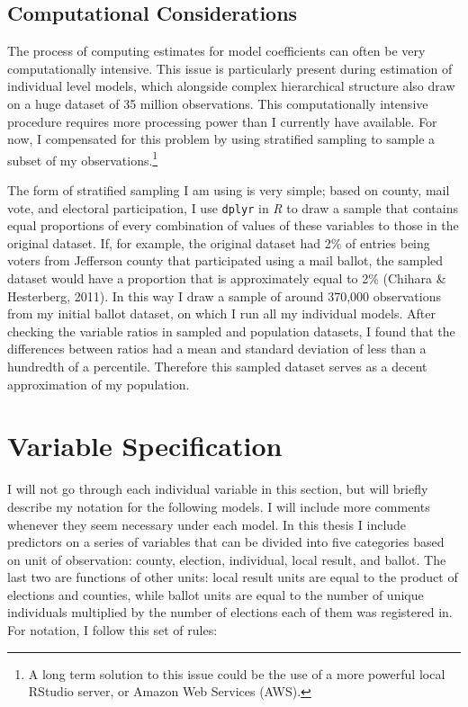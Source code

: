 \documentclass[12pt,twoside]{reedthesis}
\begin{document}
  \subsection{Computational
  Considerations}\label{computational-considerations}
  
  The process of computing estimates for model coefficients can often be
  very computationally intensive. This issue is particularly present
  during estimation of individual level models, which alongside complex
  hierarchical structure also draw on a huge dataset of 35 million
  observations. This computationally intensive procedure requires more
  processing power than I currently have available. For now, I compensated
  for this problem by using stratified sampling to sample a subset of my
  observations.\footnote{A long term solution to this issue could be the
    use of a more powerful local RStudio server, or Amazon Web Services
    (AWS).}
  
  The form of stratified sampling I am using is very simple; based on
  county, mail vote, and electoral participation, I use \texttt{dplyr} in
  \textit{R} to draw a sample that contains equal proportions of every
  combination of values of these variables to those in the original
  dataset. If, for example, the original dataset had 2\% of entries being
  voters from Jefferson county that participated using a mail ballot, the
  sampled dataset would have a proportion that is approximately equal to
  2\% (Chihara \& Hesterberg, 2011). In this way I draw a sample of around
  370,000 observations from my initial ballot dataset, on which I run all
  my individual models. After checking the variable ratios in sampled and
  population datasets, I found that the differences between ratios had a
  mean and standard deviation of less than a hundredth of a percentile.
  Therefore this sampled dataset serves as a decent approximation of my
  population.
  
  \section{Variable Specification}\label{variable-specification}
  
  I will not go through each individual variable in this section, but will
  briefly describe my notation for the following models. I will include
  more comments whenever they seem necessary under each model. In this
  thesis I include predictors on a series of variables that can be divided
  into five categories based on unit of observation: county, election,
  individual, local result, and ballot. The last two are functions of
  other units: local result units are equal to the product of elections
  and counties, while ballot units are equal to the number of unique
  individuals multiplied by the number of elections each of them was
  registered in. For notation, I follow this set of rules:
  
\end{document}
